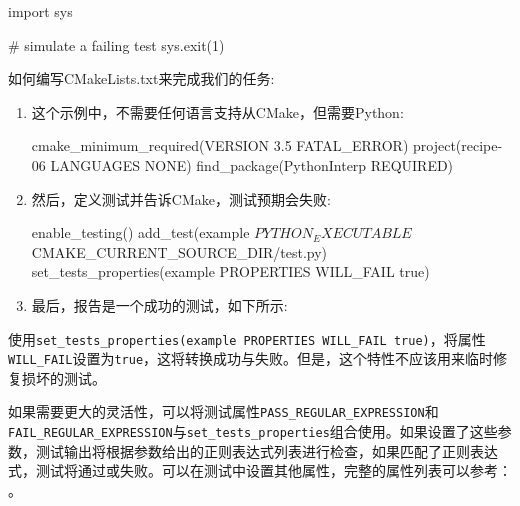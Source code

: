 \begin{codebox}[python]
import sys

# simulate a failing test
sys.exit(1)
\end{codebox}


如何编写CMakeLists.txt来完成我们的任务:

\begin{enumerate}
\item 这个示例中，不需要任何语言支持从CMake，但需要Python:

\begin{codebox}[cmake]
cmake_minimum_required(VERSION 3.5 FATAL_ERROR)
project(recipe-06 LANGUAGES NONE)
find_package(PythonInterp REQUIRED)
\end{codebox}

\item 然后，定义测试并告诉CMake，测试预期会失败:

\begin{codebox}[cmake]
enable_testing()
add_test(example ${PYTHON_EXECUTABLE} ${CMAKE_CURRENT_SOURCE_DIR}/test.py)
set_tests_properties(example PROPERTIES WILL_FAIL true)
\end{codebox}

\item 最后，报告是一个成功的测试，如下所示:


\end{enumerate}


使用\texttt{set\_tests\_properties(example PROPERTIES WILL\_FAIL true)}，将属性\texttt{WILL\_FAIL}设置为\texttt{true}，这将转换成功与失败。但是，这个特性不应该用来临时修复损坏的测试。


如果需要更大的灵活性，可以将测试属性\texttt{PASS\_REGULAR\_EXPRESSION}和\texttt{FAIL\_REGULAR\_EXPRESSION}与\texttt{set\_tests\_properties}组合使用。如果设置了这些参数，测试输出将根据参数给出的正则表达式列表进行检查，如果匹配了正则表达式，测试将通过或失败。可以在测试中设置其他属性，完整的属性列表可以参考： 。



